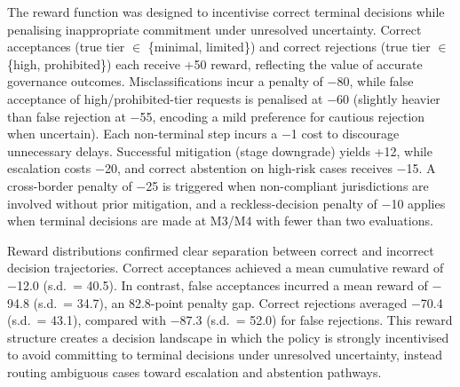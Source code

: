 \documentclass{article}
\begin{document}
The reward function was designed to incentivise correct terminal decisions while penalising inappropriate commitment under unresolved uncertainty. Correct acceptances (true tier $\in$ \{minimal, limited\}) and correct rejections (true tier $\in$ \{high, prohibited\}) each receive +50 reward, reflecting the value of accurate governance outcomes. Misclassifications incur a penalty of $-$80, while false acceptance of high/prohibited-tier requests is penalised at $-$60 (slightly heavier than false rejection at $-$55, encoding a mild preference for cautious rejection when uncertain). Each non-terminal step incurs a $-$1 cost to discourage unnecessary delays. Successful mitigation (stage downgrade) yields +12, while escalation costs $-$20, and correct abstention on high-risk cases receives $-$15. A cross-border penalty of $-$25 is triggered when non-compliant jurisdictions are involved without prior mitigation, and a reckless-decision penalty of $-$10 applies when terminal decisions are made at M3/M4 with fewer than two evaluations.

Reward distributions confirmed clear separation between correct and incorrect decision trajectories. Correct acceptances achieved a mean cumulative reward of $-$12.0 (s.d.\ = 40.5). In contrast, false acceptances incurred a mean reward of $-$94.8 (s.d.\ = 34.7), an 82.8-point penalty gap. Correct rejections averaged $-$70.4 (s.d.\ = 43.1), compared with $-$87.3 (s.d.\ = 52.0) for false rejections. This reward structure creates a decision landscape in which the policy is strongly incentivised to avoid committing to terminal decisions under unresolved uncertainty, instead routing ambiguous cases toward escalation and abstention pathways.
\end{document}
